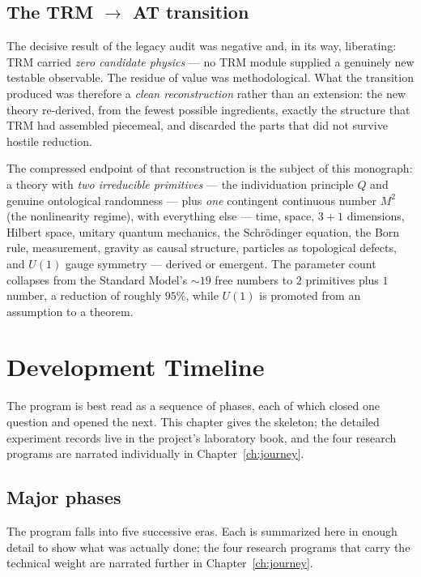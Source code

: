 \documentclass[10pt,twoside,openany]{book}
\begin{document}
\section{The TRM $\to$ AT transition}

The decisive result of the legacy audit was negative and, in its way, liberating: TRM
carried \emph{zero candidate physics} --- no TRM module supplied a genuinely new testable
observable. The residue of value was methodological. What the transition produced was
therefore a \emph{clean reconstruction} rather than an extension: the new theory
re-derived, from the fewest possible ingredients, exactly the structure that TRM had
assembled piecemeal, and discarded the parts that did not survive hostile reduction.

The compressed endpoint of that reconstruction is the subject of this monograph: a theory
with \emph{two irreducible primitives} --- the individuation principle $Q$ and genuine
ontological randomness --- plus \emph{one} contingent continuous number $M^2$ (the
nonlinearity regime), with everything else --- time, space, $3{+}1$ dimensions, Hilbert
space, unitary quantum mechanics, the Schr\"odinger equation, the Born rule, measurement,
gravity as causal structure, particles as topological defects, and $U(1)$ gauge symmetry
--- derived or emergent. The parameter count collapses from the Standard Model's
$\sim19$ free numbers to $2$ primitives plus $1$ number, a reduction of roughly $95\%$,
while $U(1)$ is promoted from an assumption to a theorem.

\chapter{Development Timeline}
\label{ch:timeline}

The program is best read as a sequence of phases, each of which closed one question and
opened the next. This chapter gives the skeleton; the detailed experiment records live in
the project's laboratory book, and the four research programs are narrated individually
in Chapter~\ref{ch:journey}.

\section{Major phases}

The program falls into five successive eras. Each is summarized here in enough detail to
show what was actually done; the four research programs that carry the technical weight
are narrated further in Chapter~\ref{ch:journey}.
\end{document}
